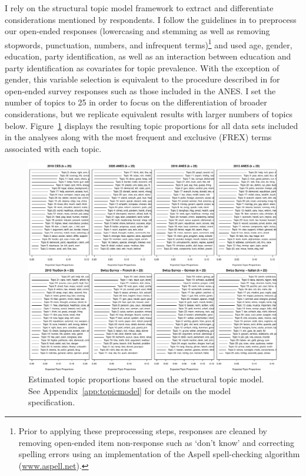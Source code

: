 I rely on the structural topic model framework to extract and differentiate considerations mentioned by respondents. I follow the guidelines in \citet{roberts2014structural} to preprocess our open-ended responses (lowercasing and stemming as well as removing stopwords, punctuation, numbers, and infrequent terms)\footnote{Prior to applying these preprocessing steps, responses are cleaned by removing open-ended item non-response such as `don't know' and correcting spelling errors using an implementation of the Aspell spell-checking algorithm (\url{www.aspell.net}).} and used age, gender, education, party identification, as well as an interaction between education and party identification as covariates for topic prevalence. With the exception of gender, this variable selection is equivalent to the procedure described in \citet{roberts2014structural} for open-ended survey responses such as those included in the ANES. I set the number of topics to 25 in order to focus on the differentiation of broader considerations, but we replicate equivalent results with larger numbers of topics below. Figure~\ref{fig:stm_prop} displays the resulting topic proportions for all data sets included in the analyses along with the most frequent and exclusive (FREX) terms associated with each topic.

\begin{figure}[h]\centering
\includegraphics[width=.89\textwidth]{../fig/stm_prop.pdf}
\caption[Estimated topic proportions based on the structural topic model]{Estimated topic proportions based on the structural topic model. See Appendix~\ref{app:topicmodel} for details on the model specification.}\label{fig:stm_prop}
\end{figure}


